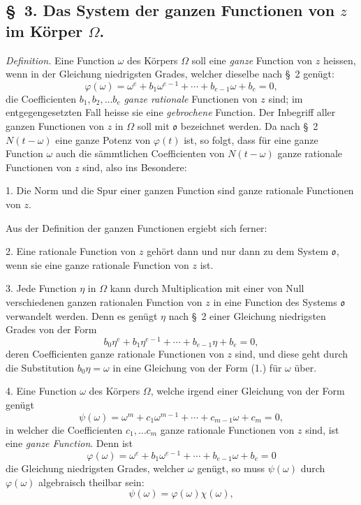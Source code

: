 \documentclass{article}
\begin{document}

\subsection*{§~3. Das System der ganzen Functionen von $z$ im Körper $\Omega$.}

\emph{Definition.} Eine Function $\omega$ des Körpers $\Omega$ soll eine \emph{ganze} Function von $z$ heissen, wenn in der Gleichung niedrigsten Grades, welcher dieselbe nach §~2 genügt:
\[ \varphi(\omega) = \omega^{e} + b_{1}\omega^{e-1} + \cdots + b_{e-1}\omega + b_{e} = 0, \tag{1.} \]
die Coefficienten $b_{1}, b_{2}, \ldots b_{e}$ \emph{ganze rationale} Functionen von $z$ sind; im entgegengesetzten Fall heisse sie eine \emph{gebrochene} Function. Der Inbegriff aller ganzen Functionen von $z$ in $\Omega$ soll mit $\mathfrak{o}$ bezeichnet werden. Da nach §~2 $N(t-\omega)$ eine ganze Potenz von $\varphi(t)$ ist, so folgt, dass für eine ganze Function $\omega$ auch die sämmtlichen Coefficienten von $N(t-\omega)$ ganze rationale Functionen von $z$ sind, also ins Besondere:

1. Die Norm und die Spur einer ganzen Function sind ganze rationale Functionen von $z$.

Aus der Definition der ganzen Functionen ergiebt sich ferner:

2. Eine rationale Function von $z$ gehört dann und nur dann zu dem System $\mathfrak{o}$, wenn sie eine ganze rationale Function von $z$ ist.

3. Jede Function $\eta$ in $\Omega$ kann durch Multiplication mit einer von Null verschiedenen ganzen rationalen Function von $z$ in eine Function des Systems $\mathfrak{o}$ verwandelt werden. Denn es genügt $\eta$ nach §~2 einer Gleichung niedrigsten Grades von der Form
\[ b_{0}\eta^{e} + b_{1}\eta^{e-1} + \cdots + b_{e-1}\eta + b_{e} = 0, \]
deren Coefficienten ganze rationale Functionen von $z$ sind, und diese geht durch die Substitution $b_{0}\eta = \omega$ in eine Gleichung von der Form (1.) für $\omega$ über.

4. Eine Function $\omega$ des Körpers $\Omega$, welche irgend einer Gleichung von der Form genügt
\[ \psi(\omega) = \omega^{m} + c_{1}\omega^{m-1} + \cdots + c_{m-1}\omega + c_{m} = 0, \]
in welcher die Coefficienten $c_{1}, \ldots c_{m}$ ganze rationale Functionen von $z$ sind, ist eine \emph{ganze Function}. Denn ist
\[ \varphi(\omega) = \omega^{e} + b_{1}\omega^{e-1} + \cdots + b_{e-1}\omega + b_{e} = 0 \]
die Gleichung niedrigsten Grades, welcher $\omega$ genügt, so muss $\psi(\omega)$ durch $\varphi(\omega)$ algebraisch theilbar sein:
\[ \psi(\omega) = \varphi(\omega)\chi(\omega), \]
\end{document}
